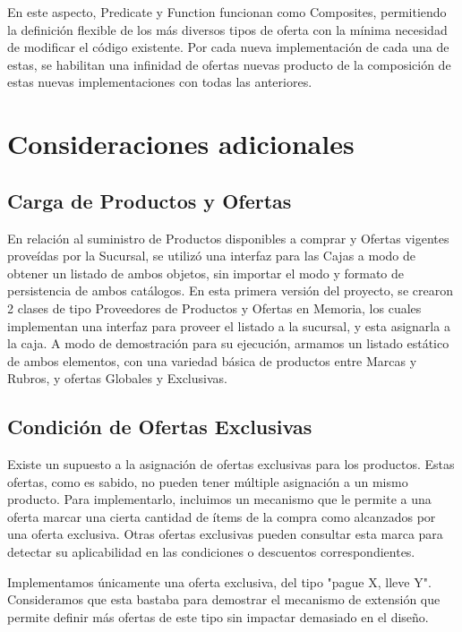 \documentclass[a4paper,11pt]{article}
\begin{document}
En este aspecto, Predicate y Function funcionan como Composites, permitiendo la
definición flexible de los más diversos tipos de oferta con la mínima necesidad
de modificar el código existente. Por cada nueva implementación de cada una de
estas, se habilitan una infinidad de ofertas nuevas producto de la composición
de estas nuevas implementaciones con todas las anteriores.

\section{Consideraciones adicionales}

\subsection{Carga de Productos y Ofertas}

En relación al suministro de Productos disponibles a comprar y Ofertas vigentes
proveídas por la Sucursal, se utilizó una interfaz para las Cajas a modo de
obtener un listado de ambos objetos, sin importar el modo y formato de
persistencia de ambos catálogos.  En esta primera versión del proyecto, se
crearon 2 clases de tipo Proveedores de Productos y Ofertas en Memoria, los
cuales implementan una interfaz para proveer el listado a la sucursal, y esta
asignarla a la caja.  A modo de demostración para su ejecución, armamos un
listado estático de ambos elementos, con una variedad básica de productos entre
Marcas y Rubros, y ofertas Globales y Exclusivas.

\subsection{Condición de Ofertas Exclusivas}

Existe un supuesto a la asignación de ofertas exclusivas para los productos.
Estas ofertas, como es sabido, no pueden tener múltiple asignación a un mismo
producto. Para implementarlo, incluimos un mecanismo que le permite a una
oferta marcar una cierta cantidad de ítems de la compra como alcanzados por una
oferta exclusiva. Otras ofertas exclusivas pueden consultar esta marca para
detectar su aplicabilidad en las condiciones o descuentos correspondientes.

Implementamos únicamente una oferta exclusiva, del tipo "pague X, lleve Y".
Consideramos que esta bastaba para demostrar el mecanismo de extensión que
permite definir más ofertas de este tipo sin impactar demasiado en el diseño.
\end{document}
